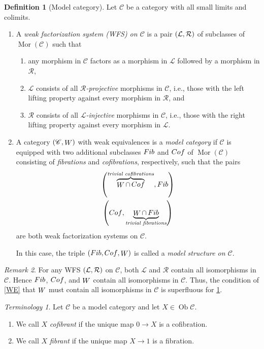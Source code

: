 \documentclass[10pt,letterpaper,cm]{nupset}
\theoremstyle{definition}
\newtheorem{definition}{Definition}[subsection]
\theoremstyle{theorem}
\theoremstyle{remark}
\newtheorem{remark}[definition]{Remark}
\newtheorem*{term}{Terminology}
\renewcommand{\L}{\mathcal L}
\newcommand{\RI}{\mathcal R}
\DeclareMathOperator{\ob}{Ob}
\DeclareMathOperator{\mor}{Mor}
\newcommand{\0}{\mathbf{0}}
\newcommand{\1}{\mathbf{1}}
\newcommand{\2}{\mathbf{2}}
\renewcommand{\c}{\mathscr{C}}
\DeclareMathOperator{\fib}{\mathnormal{Fib}}
\DeclareMathOperator{\cof}{\mathnormal{Cof}}
\DeclareMathOperator{\we}{\mathnormal{W}}
\newcommand{\be}{\begin{enumerate}}
\newcommand{\ee}{\end{enumerate}}
\begin{document}
\begin{definition}[Model category]\label{MC} Let $\c$ be a category with all small limits and colimits.
\be
\item A \textit{weak factorization system (WFS) on $\c$} is a pair $\mleft(\L, \RI\mright)$ of subclasses of $\mor(\c)$ such that 
\be[label=(\roman*)]
\item any morphism in $\c$ factors as a morphism in $\L$ followed by a morphism in $\RI$,
\item $\L$ consists of all \textit{$\RI$-projective} morphisms in $\c$, i.e., those with the left lifting property against every morphism in $\RI$, and
\item $\RI$ consists of all \textit{$\L$-injective} morphisms in $\c$, i.e., those with the right lifting property against every morphism in $\L$.
\ee
\item A category $\mleft(\c, \we\mright)$ with weak equivalences is a \textit{model category} if $\c$ is equipped with two additional subclasses $\fib$ and $\cof$ of $\mor(\c)$ consisting of \textit{fibrations} and \textit{cofibrations}, respectively, such that the pairs
\begin{gather*}
\mleft(\overbrace{\we \cap \cof}^{\textit{trivial cofibrations}} , \fib  \mright)
\\ \mleft(\cof, \underbrace{\we \cap \fib}_{\textit{trivial fibrations}}   \mright)
\end{gather*}
 are both weak factorization systems on $\c$.
 
 In this case,  the triple $\mleft(\fib, \cof, \we\mright)$ is called a \textit{model structure on $\c$}.
\ee
\end{definition}

\begin{remark}
For any WFS $\mleft(\L, \RI\mright)$ on $\c$, both $\L$ and $\RI$ contain all isomorphisms in $\c$. Hence $\fib$, $\cof$, and $\we$ contain all isomorphisms in $\c$. Thus, the condition of \cref{WE} that $\we$ must contain all isomorphisms in $\c$ is superfluous for \cref{MC}.
\end{remark}

\smallskip

\begin{term} Let $\c$ be a model category and let $X\in \ob{\c}$.
\be
\item We call $X$ \textit{cofibrant} if the unique map $0\to X$ is a cofibration.
\item We call $X$ \textit{fibrant} if the unique map $X\to 1$ is a fibration.
\ee
\end{term}
\end{document}
